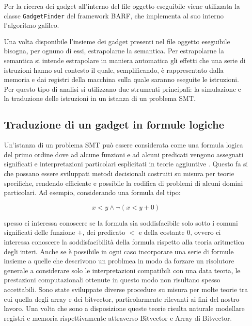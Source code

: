 Per la ricerca dei gadget all'interno del file oggetto eseguibile
viene utilizzata la classe \lstinline{GadgetFinder} del framework
BARF, che implementa al suo interno l'algoritmo
galileo\cite{Shacham-2007}.


Una volta disponibile l'insieme dei gadget presenti nel file oggetto
eseguibile bisogna, per ognuno di essi, estrapolarne la semantica. Per
estrapolarne la semantica si intende estrapolare in maniera automatica
gli effetti che una serie di istruzioni hanno sul contesto il quale,
semplificando, è rappresentato dalla memoria e dai registri della
macchina sulla quale saranno eseguite le istruzioni. Per questo tipo
di analisi si utilizzano due strumenti principali: la simulazione e la
traduzione delle istruzioni in un istanza di un problema SMT. 

\subsection{Traduzione di un gadget in formule logiche}

Un'istanza di un problema SMT può essere considerata come una formula
logica del primo ordine dove ad alcune funzioni e ad alcuni predicati
vengono assegnati significati e interpretazioni particolari
esplicitati in teorie aggiuntive \cite{Barrett-14}. Questo fa si che
possano essere sviluppati metodi decisionali costruiti su misura per
teorie specifiche, rendendo efficiente e possibile la codifica di
problemi di alcuni domini particolari. Ad esempio, considerando una
formula del tipo:

$$ x < y ∧ ¬(x < y + 0)$$

spesso ci interessa conoscere se la formula sia soddisfacibile solo
sotto i comuni significati delle funzione $+$, dei predicato $<$ e
della costante $0$, ovvero ci interessa conoscere la soddisfacibilità
della formula rispetto alla teoria aritmetica degli interi. Anche se è
possibile in ogni caso incorporare una serie di formule insieme a
quelle che descrivono un problmea in modo da forzare un risolutore
generale a considerare solo le interpretazioni compatibili con una
data teoria, le prestazioni computazionali ottenute in questo modo non
risultano spesso accettabili. Sono state sviluppate diverse procedure
su misura per molte teorie tra cui quella degli array e dei bitvector,
particolarmente rilevanti ai fini del nostro lavoro. Una volta che
sono a disposizione queste teorie risulta naturale modellare registri
e memoria rispettivamente attraverso Bitvector e Array di Bitvector.

